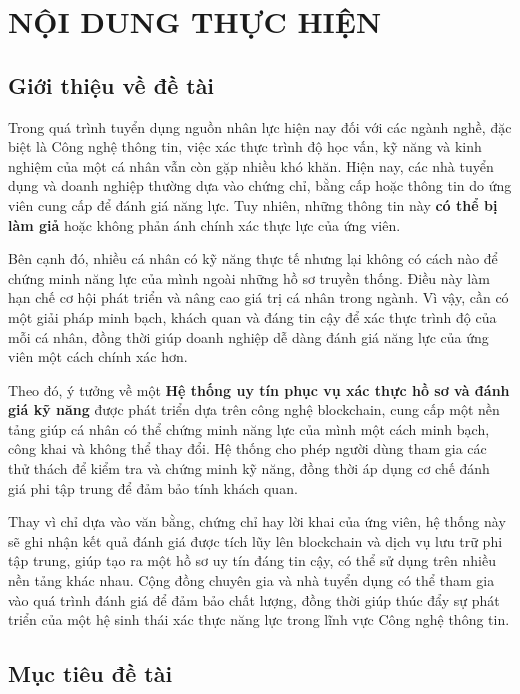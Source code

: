 \documentclass{article}[14pt]
\begin{document}
\section{NỘI DUNG THỰC HIỆN}
 {

  \subsection{Giới thiệu về đề tài}

  Trong quá trình tuyển dụng nguồn nhân lực hiện nay đối với các ngành nghề, đặc biệt là Công nghệ thông tin,
  việc xác thực trình độ học vấn, kỹ năng và kinh nghiệm của một cá nhân vẫn còn gặp nhiều khó khăn.
  Hiện nay, các nhà tuyển dụng và doanh nghiệp thường dựa vào chứng chỉ, bằng cấp hoặc thông tin do ứng viên cung cấp để đánh giá năng lực.
  Tuy nhiên, những thông tin này \textbf{có thể bị làm giả} hoặc không phản ánh chính xác thực lực của ứng viên.

  Bên cạnh đó, nhiều cá nhân có kỹ năng thực tế nhưng lại không có cách nào để chứng minh năng lực của mình ngoài những hồ sơ truyền thống.
  Điều này làm hạn chế cơ hội phát triển và nâng cao giá trị cá nhân trong ngành.
  Vì vậy, cần có một giải pháp minh bạch, khách quan và đáng tin cậy để xác thực trình độ của mỗi cá nhân,
  đồng thời giúp doanh nghiệp dễ dàng đánh giá năng lực của ứng viên một cách chính xác hơn.

  Theo đó, ý tưởng về một \textbf{Hệ thống uy tín phục vụ xác thực hồ sơ và đánh giá kỹ năng} được phát triển dựa trên công nghệ blockchain,
  cung cấp một nền tảng giúp cá nhân có thể chứng minh năng lực của mình một cách minh bạch, công khai và không thể thay đổi.
  Hệ thống cho phép người dùng tham gia các thử thách để kiểm tra và chứng minh kỹ năng, đồng thời áp dụng cơ chế đánh giá phi tập trung để đảm bảo tính khách quan.

  Thay vì chỉ dựa vào văn bằng, chứng chỉ hay lời khai của ứng viên, hệ thống này sẽ ghi nhận kết quả đánh giá được tích lũy lên blockchain và dịch vụ lưu trữ phi tập trung,
  giúp tạo ra một hồ sơ uy tín đáng tin cậy, có thể sử dụng trên nhiều nền tảng khác nhau.
  Cộng đồng chuyên gia và nhà tuyển dụng có thể tham gia vào quá trình đánh giá để đảm bảo chất lượng,
  đồng thời giúp thúc đẩy sự phát triển của một hệ sinh thái xác thực năng lực trong lĩnh vực Công nghệ thông tin.

  \subsection{Mục tiêu đề tài}

}
\end{document}
